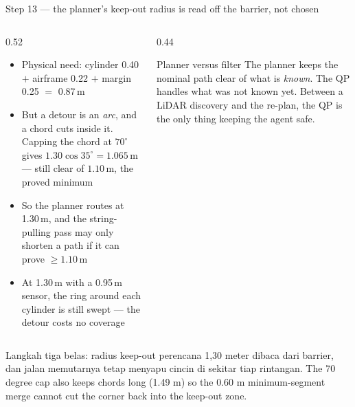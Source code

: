 \documentclass[aspectratio=169,11pt,t]{beamer}
\begin{document}
\begin{frame}{Step 13 --- the planner's keep-out radius is read off the barrier, not chosen}
  \begin{columns}[T,onlytextwidth]
    \begin{column}{0.52\textwidth}
      \begin{itemize}\bulletgap\scriptsize
        \item Physical need: cylinder 0.40 $+$ airframe 0.22 $+$ margin 0.25
              $=$ \num{0.87}\,m
        \item But a detour is an \emph{arc}, and a chord cuts inside it. Capping
              the chord at $70^\circ$ gives
              $1.30\cos35^\circ=\num{1.065}$\,m --- still clear of
              $\num{1.10}$\,m, the proved minimum
        \item So the planner routes at \num{1.30}\,m, and the string-pulling pass
              may only shorten a path if it can prove $\ge\num{1.10}$\,m
        \item At \num{1.30}\,m with a \num{0.95}\,m sensor, the ring around each
              cylinder is still swept --- the detour costs no coverage
      \end{itemize}
    \end{column}
    \begin{column}{0.44\textwidth}
      \vskip2mm
      \begin{callout}{Planner versus filter}
        The planner keeps the nominal path clear of what is \emph{known}. The QP
        handles what was not known yet. Between a LiDAR discovery and the
        re-plan, the QP is the only thing keeping the agent safe.
      \end{callout}
    \end{column}
  \end{columns}
    {Langkah tiga belas: radius keep-out perencana 1,30 meter dibaca dari barrier, dan jalan memutarnya tetap menyapu cincin di sekitar tiap rintangan.}
    {The 70 degree cap also keeps chords long (1.49 m) so the 0.60 m
        minimum-segment merge cannot cut the corner back into the keep-out zone.}
\end{frame}
\end{document}

